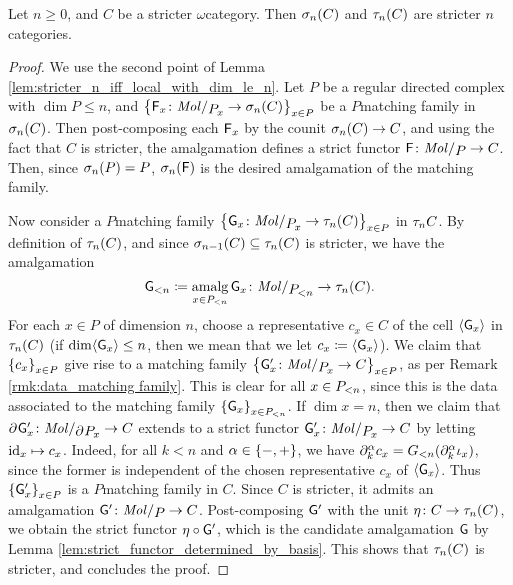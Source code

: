 \begin{lem} \label{lem:truncation_stricter_are_stricter}
    Let \( n \geq 0 \), and \( C \) be a stricter \( \omega \)\nbd category.
    Then \( \skel{n}(C) \) and \( \trunc{n}(C) \) are stricter \( n \)\nbd categories.
\end{lem}
\begin{proof}
    We use the second point of Lemma \ref{lem:stricter_n_iff_local_with_dim_le_n}.
    Let \( P \) be a regular directed complex with \( \dim P \le n \), and \( \set{\F_x \colon \molecin{\imel{P}{x}} \to \skel{n}(C)}_{x \in P} \) be a \( P \)\nbd matching family in \( \skel{n}(C) \).
    Then post-composing each \( \F_x \) by the counit \( \skel{n}(C) \to C \), and using the fact that \( C \) is stricter, the amalgamation defines a strict functor \( \F \colon \molecin{P} \to C \).
    Then, since \( \skel{n}(P) = P \), \( \skel{n}(\F) \) is the desired amalgamation of the matching family.

    Now consider a \( P \)\nbd matching family \( \set{\G_x \colon \molecin{\imel{P}{x}} \to \trunc{n}(C)}_{x \in P} \) in \( \trunc{n}C \).
    By definition of \( \trunc{n}(C) \), and since \( \skel{n - 1}(C) \subseteq \trunc{n}(C) \) is stricter, we have the amalgamation
    \begin{equation*}
        \gr{< n }{\G} \eqdef \amalg_{x \in \gr{< n}{P}} \G_x \colon \molecin{\gr{< n}{P}} \to \trunc{n}(C).
    \end{equation*}
    For each \( x \in P \) of dimension \( n \), choose a representative \( c_x \in C \) of the cell \( \pcell{\G_x} \) in \( \trunc{n}(C) \) (if \( \dim \pcell{\G_x} \le n \), then we mean that we let \( c_x \eqdef \pcell{\G_x} \)).
    We claim that \( \set{c_x}_{x \in P} \) give rise to a matching family \( \set{\G'_x \colon \molecin{\imel{P}{x}} \to C}_{x \in P} \), as per Remark \ref{rmk:data_matching family}.
    This is clear for all \( x \in \gr{< n}{P} \), since this is the data associated to the matching family \( \set{\G_x}_{x \in \gr{< n}{P}} \). 
    If \( \dim x = n \), then we claim that \( \bd{}{}\G'_x \colon \molecin{\bd{}{}\imel{P}{x}} \to C \) extends to a strict functor \( \G'_x \colon \molecin{\imel{P}{x}} \to C \) by letting \( \idd{x} \mapsto c_x \).
    Indeed, for all \( k < n \) and \( \a \in \set{-, +} \), we have \( \bd{k}{\a} c_x = \gr{< n}{G}(\bd{k}{\a} \mapel{x} ) \), since the former is independent of the chosen representative \( c_x \) of \( \pcell{\G_x} \).
    Thus \( \set{\G'_x}_{x \in P} \) is a \( P \)\nbd matching family in \( C \).
    Since \( C \) is stricter, it admits an amalgamation \( \G' \colon \molecin{P} \to C \). 
    Post-composing \( \G' \) with the unit \( \eta \colon C \to \trunc{n}(C) \), we obtain the strict functor \( \eta \after \G' \), which is the candidate amalgamation \( \G \) by Lemma \ref{lem:strict_functor_determined_by_basis}.
    This shows that \( \trunc{n}(C) \) is stricter, and concludes the proof.
\end{proof}

